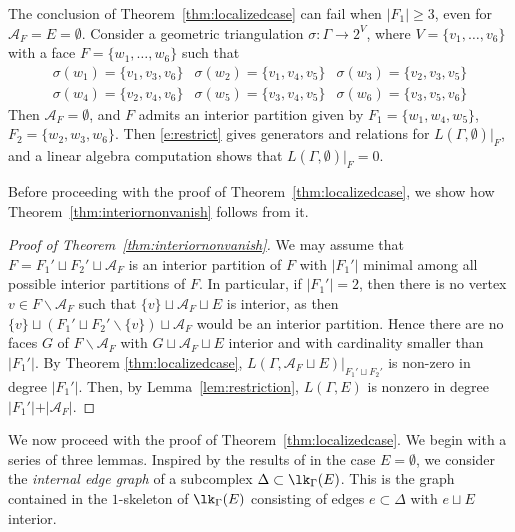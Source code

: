 \begin{example}\label{example:nonrestriction}
The conclusion of Theorem~\ref{thm:localizedcase} can fail when $\vert F_1 \vert \ge 3$, even for $\mathcal{A}_F = E = \emptyset$.  Consider a geometric triangulation $\sigma \colon \Gamma \to 2^V$, where $V = \{v_1, \ldots, v_6 \}$ with a face $F = \{w_1, \ldots, w_6\}$ such that 
\[
\begin{array}{lll}
\sigma(w_1) = \{ v_1, v_3, v_6 \} & \sigma(w_2) = \{ v_1, v_4, v_5 \} & \sigma(w_3) = \{ v_2, v_3, v_5 \} \\
\sigma(w_4) = \{ v_2, v_4, v_6 \} & \sigma(w_5) = \{ v_3, v_4, v_5 \} & \sigma(w_6) = \{ v_3, v_5, v_6 \}
\end{array}
\]
Then $\mathcal{A}_F = \emptyset$, and $F$ admits an interior partition given by $F_1 = \{w_1, w_4, w_5\}$, $F_2 = \{w_2, w_3, w_6\}$. Then \eqref{e:restrict} gives generators and relations for $L(\Gamma, \emptyset)|_{F}$, and a linear algebra computation shows that $L(\Gamma, \emptyset)|_{F} = 0$. 
\end{example}

Before proceeding with the proof of Theorem~\ref{thm:localizedcase}, we show how Theorem~\ref{thm:interiornonvanish} follows from it. 

\begin{proof}[Proof of Theorem~\ref{thm:interiornonvanish}]
We may assume that $F = F_1' \sqcup F_2' \sqcup \mathcal{A}_F$ is an interior partition of $F$ with $\vert F_1' \vert$ minimal among all possible interior partitions of $F$. In particular, if $\vert F_1' \vert = 2$, then there is no vertex $v \in F  \smallsetminus \mathcal{A}_F$ such that $\{v\} \sqcup \mathcal{A}_F \sqcup E$ is interior, as then $\{v\} \sqcup (F_1' \sqcup F_2' \smallsetminus \{v\}) \sqcup \mathcal{A}_F$ would be an interior partition. Hence there are no faces $G$ of $F \smallsetminus \mathcal{A}_F$ with $G \sqcup \mathcal{A}_F \sqcup E$ interior and with cardinality smaller than $\vert F_1' \vert$. 
By Theorem \ref{thm:localizedcase}, $L(\Gamma, \mathcal{A}_F \sqcup E)|_{F_1' \sqcup F_2'}$ is non-zero in degree $\vert F_1' \vert$. Then, by Lemma~\ref{lem:restriction},  $L(\Gamma, E)$ is nonzero in degree $\vert F_1' \vert + \vert \mathcal{A}_F \vert$.
\end{proof}

We now proceed with the proof of Theorem~\ref{thm:localizedcase}. We begin with a series of three lemmas. Inspired by the results of \cite{dMGPSS20} in the case $E = \emptyset$, we consider the \emph{internal edge graph} of a subcomplex $\Delta \subset \lk_{\Gamma}(E)$. This is the graph contained in the $1$-skeleton of $\lk_{\Gamma}(E)$ consisting of edges $e \subset \Delta$ with $e \sqcup E$ interior. 

